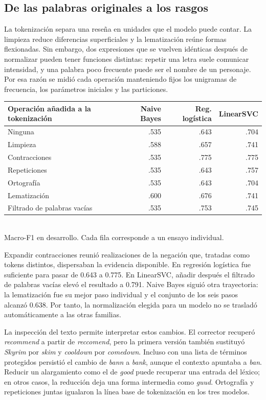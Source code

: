 \documentclass[11pt,letterpaper]{article}
\begin{document}
\subsection*{De las palabras originales a los rasgos}
La tokenización separa una reseña en unidades que el modelo puede contar. La limpieza reduce diferencias superficiales y la lematización reúne formas flexionadas. Sin embargo, dos expresiones que se vuelven idénticas después de normalizar pueden tener funciones distintas: repetir una letra suele comunicar intensidad, y una palabra poco frecuente puede ser el nombre de un personaje. Por esa razón se midió cada operación manteniendo fijos los unigramas de frecuencia, los parámetros iniciales y las particiones.

\begin{center}\small
\begin{tabular}{lrrr}\toprule
Operación añadida a la tokenización & Naive Bayes & Reg. logística & LinearSVC\\\midrule
Ninguna & .535 & .643 & .704\\
Limpieza & .588 & .657 & .741\\
Contracciones & .535 & .775 & .775\\
Repeticiones & .535 & .643 & .757\\
Ortografía & .535 & .643 & .704\\
Lematización & .600 & .676 & .741\\
Filtrado de palabras vacías & .535 & .753 & .745\\\bottomrule
\end{tabular}\\{\small Macro-F1 en desarrollo. Cada fila corresponde a un ensayo individual.}
\end{center}

Expandir contracciones reunió realizaciones de la negación que, tratadas como tokens distintos, dispersaban la evidencia disponible. En regresión logística fue suficiente para pasar de 0.643 a 0.775. En LinearSVC, añadir después el filtrado de palabras vacías elevó el resultado a 0.791. Naive Bayes siguió otra trayectoria: la lematización fue su mejor paso individual y el conjunto de los seis pasos alcanzó 0.638. Por tanto, la normalización elegida para un modelo no se trasladó automáticamente a las otras familias.

La inspección del texto permite interpretar estos cambios. El corrector recuperó \textit{recommend} a partir de \textit{reccomend}, pero la primera versión también sustituyó \textit{Skyrim} por \textit{skim} y \textit{cooldown} por \textit{comedown}. Incluso con una lista de términos protegidos persistió el cambio de \textit{bann} a \textit{bank}, aunque el contexto apuntaba a \textit{ban}. Reducir un alargamiento como el de \textit{good} puede recuperar una entrada del léxico; en otros casos, la reducción deja una forma intermedia como \textit{guud}. Ortografía y repeticiones juntas igualaron la línea base de tokenización en los tres modelos.
\end{document}
